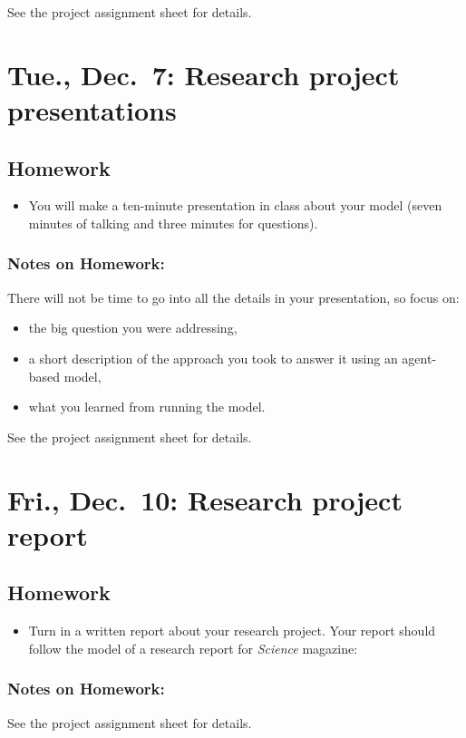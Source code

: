 \documentclass[
]{article}
\providecommand{\tightlist}{%
  \setlength{\itemsep}{0pt}\setlength{\parskip}{0pt}}
\begin{document}
See the project assignment sheet for details.

\hypertarget{tue.-dec.-7-research-project-presentations}{%
\section{Tue., Dec.~7: Research project
presentations}\label{tue.-dec.-7-research-project-presentations}}

\hypertarget{homework-15}{%
\subsection{Homework}\label{homework-15}}

\begin{itemize}
\tightlist
\item
  You will make a ten-minute presentation in class about your model
  (seven minutes of talking and three minutes for questions).
\end{itemize}

\hypertarget{notes-on-homework-11}{%
\subsubsection{Notes on Homework:}\label{notes-on-homework-11}}

There will not be time to go into all the details in your presentation,
so focus on:

\begin{itemize}
\tightlist
\item
  the big question you were addressing,
\item
  a short description of the approach you took to answer it using an
  agent-based model,
\item
  what you learned from running the model.
\end{itemize}

See the project assignment sheet for details.

\hypertarget{fri.-dec.-10-research-project-report}{%
\section{Fri., Dec.~10: Research project
report}\label{fri.-dec.-10-research-project-report}}

\hypertarget{homework-16}{%
\subsection{Homework}\label{homework-16}}

\begin{itemize}
\tightlist
\item
  Turn in a written report about your research project. Your report
  should follow the model of a research report for \emph{Science}
  magazine:
\end{itemize}

\hypertarget{notes-on-homework-12}{%
\subsubsection{Notes on Homework:}\label{notes-on-homework-12}}

See the project assignment sheet for details.
\end{document}
